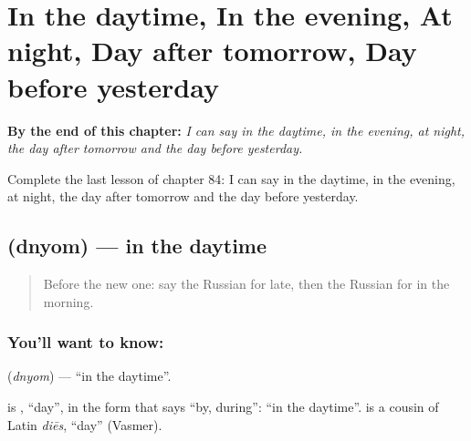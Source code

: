 
\chapter{In the daytime, In the evening, At night, Day after tomorrow, Day before yesterday}
\label{ch:ru-in-the-daytime-in-the-evening-at-night-day-after-tomorrow-day-before-yesterday}

\begin{chapteropening}
\textbf{By the end of this chapter:} \emph{I can say in the daytime, in the evening, at night, the day after tomorrow and the day before yesterday.}

Complete the last lesson of chapter 84: I can say in the daytime, in the evening, at night, the day after tomorrow and the day before yesterday.
\end{chapteropening}

\section[\texorpdfstring{\ru{днём} (dnyom)}{днём (dnyom)}]{ (dnyom) — in the daytime}

\label{lesson:RU-C84-in-the-daytime}



\begin{quote}
Before the new one: say the Russian for late, then the Russian for in the morning.
\end{quote}

\subsection*{You'll want to know: }
\textbf{} (\emph{dnyom}) — \textquotedblleft{}in the daytime\textquotedblright{}.

\begin{cousinweb}
\textbf{} is \emph{}, \textquotedblleft{}day\textquotedblright{}, in the form that says \textquotedblleft{}by, during\textquotedblright{}: \textquotedblleft{}in the daytime\textquotedblright{}. \emph{} is a cousin of Latin \emph{diēs}, \textquotedblleft{}day\textquotedblright{} (Vasmer).
\end{cousinweb}


